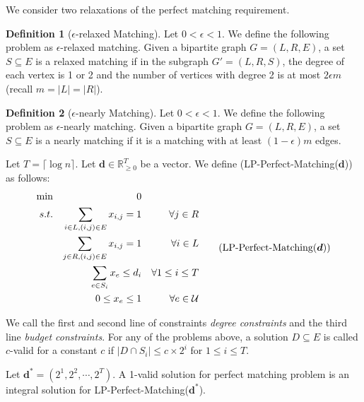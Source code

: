 \documentclass[11pt,a4paper]{article} \usepackage{enumitem}
\newcommand{\calU}{\mathcal{U}}
\newcommand{\boldd}{\boldsymbol{d}}
\newcommand{\R}{\mathbb{R}}
\theoremstyle{definition}
\newtheorem{definition}{Definition}[section]
\begin{document}
We consider two relaxations of the perfect matching requirement.

\begin{definition}[$\epsilon$-relaxed Matching]
Let $0<\epsilon<1$. We define the following problem as $\epsilon$-relaxed matching. Given a bipartite graph $G=(L,R,E)$, a set $S\subseteq E$ is a relaxed matching if in the subgraph $G'=(L,R,S)$, the degree of each vertex is 1 or 2 and the number of vertices with degree 2 is at most $2\epsilon m$ (recall $m=|L|=|R|$).
\end{definition}

\begin{definition}[$\epsilon$-nearly Matching]
Let $0<\epsilon<1$. We define the following problem as $\epsilon$-nearly matching. Given a bipartite graph $G=(L,R,E)$, a set $S\subseteq E$ is a nearly matching if it is a matching with at least $(1-\epsilon)m$ edges.
\end{definition}

Let $T=\lceil \log n\rceil$. Let $\boldd\in\R_{\geq 0}^T$ be a vector. We define (LP-Perfect-Matching($\boldd$)) as follows:
\begin{equation}
    \begin{aligned}
    \min && 0 && \\
     s.t. && \sum_{i\in L, (i,j)\in E} x_{i,j}=1 && \forall j\in R\\
     && \sum_{j\in R, (i,j)\in E} x_{i,j}=1 && \forall i\in L\\
    &&\sum_{e\in S_i} x_e\leq d_i && \forall 1\leq i\leq T\\
    && 0\leq x_e\leq 1 && \forall e\in\calU
\end{aligned}
\tag{LP-Perfect-Matching($\boldd$)}
\label{LP-Perfect-M}
\end{equation}


We call the first and second line of constraints {\em degree constraints} and the third line {\em budget constraints}. For any of the problems above, a solution $D\subseteq E$ is called $c$-valid for a constant $c$ if $|D\cap S_i|\leq c\times 2^i$ for $1\leq i\leq T$.

Let $\boldd^*=(2^1,2^2,\cdots,2^T)$. A 1-valid solution for perfect matching problem is an integral solution for LP-Perfect-Matching($\boldd^{*}$).
\end{document}

